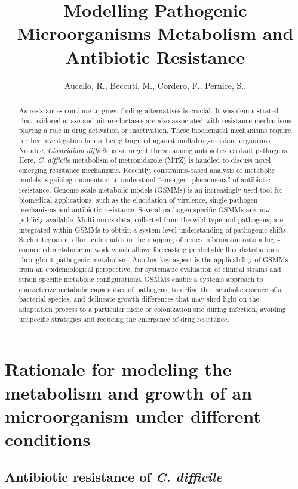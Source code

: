 \documentclass{article}
\title{Modelling Pathogenic Microorganisms Metabolism and Antibiotic Resistance}
\author{Aucello, R., Beccuti, M., Cordero, F., Pernice, S.,}
\begin{document}
\maketitle

\begin{abstract}
As resistances continue to grow, finding alternatives is crucial. It was demonstrated that oxidoreductase and nitroreductases are also associated with resistance mechanisms playing a role in drug activation or inactivation. These biochemical mechanisms require further investigation before being targeted against multidrug-resistant organisms. Notable, {\it Clostridium difficile} is an urgent threat among antibiotic-resistant pathogens. Here, {\it C. difficile} metabolism of metronidazole (MTZ) is handled to discuss novel emerging resistance mechanisms. Recently, constraints-based analysis of metabolic models is gaining momentum to understand “emergent phenomena” of antibiotic resistance. Genome-scale metabolic models (GSMMs) is an increasingly used tool for biomedical applications, such as the elucidation of virulence, single pathogen mechanisms and antibiotic resistance. Several pathogen-specific GSMMs are now publicly available. Multi-omics data, collected from the wild-type and pathogens, are integrated within GSMMs to obtain a system-level understanding of pathogenic shifts. Such integration effort culminates in the mapping of omics information onto a high-connected metabolic network which allows forecasting predictable flux distributions throughout pathogenic metabolism. Another key aspect is the applicability of GSMMs from an epidemiological perspective, for systematic evaluation of clinical strains and strain specific metabolic configurations. GSMMs enable a systems approach to characterize metabolic capabilities of pathogens, to define the metabolic essence of a bacterial species, and delineate growth differences that may shed light on the adaptation process to a particular niche or colonization site during infection, avoiding unspecific strategies and reducing the emergence of drug resistance.
\end{abstract}

\section{Rationale for modeling the metabolism and growth of an microorganism under different conditions}

\subsection{Antibiotic resistance of {\it C. difficile}}
\end{document}
